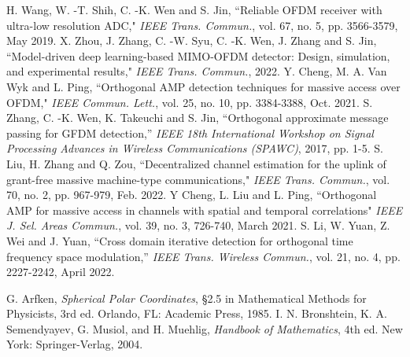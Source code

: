 \documentclass[journal]{IEEEtran}
\begin{document}
\begin{thebibliography}{1}
H. Wang, W. -T. Shih, C. -K. Wen and S. Jin, ``Reliable OFDM receiver with ultra-low resolution ADC," \textit{IEEE Trans. Commun.}, vol. 67, no. 5, pp. 3566-3579, May 2019.
X. Zhou, J. Zhang, C. -W. Syu, C. -K. Wen, J. Zhang and S. Jin, ``Model-driven deep learning-based MIMO-OFDM detector: Design, simulation, and experimental results," \textit{IEEE Trans. Commun.}, 2022.
Y. Cheng, M. A. Van Wyk and L. Ping, ``Orthogonal AMP detection techniques for massive access over OFDM," \textit{IEEE Commun. Lett.}, vol. 25, no. 10, pp. 3384-3388, Oct. 2021.
S. Zhang, C. -K. Wen, K. Takeuchi and S. Jin, ``Orthogonal approximate message passing for GFDM detection,'' \textit{IEEE 18th International Workshop on Signal Processing Advances in Wireless Communications (SPAWC)}, 2017, pp. 1-5.  
S. Liu, H. Zhang and Q. Zou, ``Decentralized channel estimation for the uplink of grant-free massive machine-type communications," \textit{IEEE Trans. Commun.}, vol. 70, no. 2, pp. 967-979, Feb. 2022.  
Y Cheng, L. Liu and L. Ping, ``Orthogonal AMP for massive access in channels with spatial and temporal correlations" \textit{IEEE J. Sel. Areas Commun.}, vol. 39, no. 3, 726-740, March 2021.
S. Li, W. Yuan, Z. Wei and J. Yuan, ``Cross domain iterative detection for orthogonal time frequency space modulation,'' \textit{IEEE Trans. Wireless Commun.}, vol. 21, no. 4, pp. 2227-2242, April 2022.



G. Arfken, \textit{Spherical Polar Coordinates}, §2.5 in Mathematical Methods for Physicists, 3rd ed. Orlando, FL: Academic Press, 1985.
I. N. Bronshtein, K. A. Semendyayev, G. Musiol, and H. Muehlig, \textit{Handbook of Mathematics}, 4th ed. New York: Springer-Verlag, 2004.


\end{thebibliography}
\end{document}
